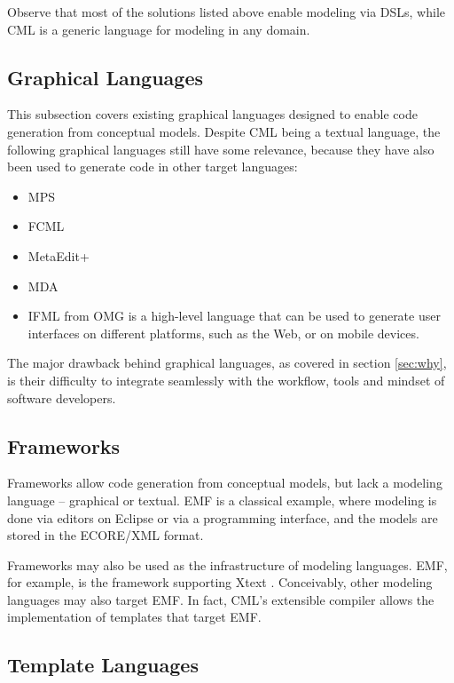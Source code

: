 Observe that most of the solutions listed above enable modeling via DSLs,
while CML is a generic language for modeling in any domain.

\subsection{Graphical Languages}

This subsection covers existing graphical languages designed to enable code generation from conceptual models.
Despite CML being a textual language,
the following graphical languages still have some relevance,
because they have also been used to generate code in other target languages:

\begin{itemize}
\item MPS \cite{voelter} 
\item FCML \cite{fcml} 
\item MetaEdit+ \cite{metaedit}
\item MDA \cite{mda}

\item IFML \cite{ifml} from OMG is a high-level language 
that can be used to generate user interfaces on different platforms,
such as the Web, or on mobile devices.

\end{itemize}

The major drawback behind graphical languages,
as covered in section \ref{sec:why},
is their difficulty to integrate seamlessly with the workflow, tools and mindset of software developers.

\subsection{Frameworks}\label{subsec:frameworks}

Frameworks allow code generation from conceptual models, but lack a modeling language -- graphical or textual. 
EMF \cite{emf} is a classical example,
where modeling is done via editors on Eclipse or via a programming interface,
and the models are stored in the ECORE/XML format. 

Frameworks may also be used as the infrastructure of modeling languages.
EMF, for example, is the framework supporting Xtext \cite{xtext}.
Conceivably, other modeling languages may also target EMF.
In fact, CML's extensible compiler allows the implementation of templates that target EMF.

\subsection{Template Languages}

